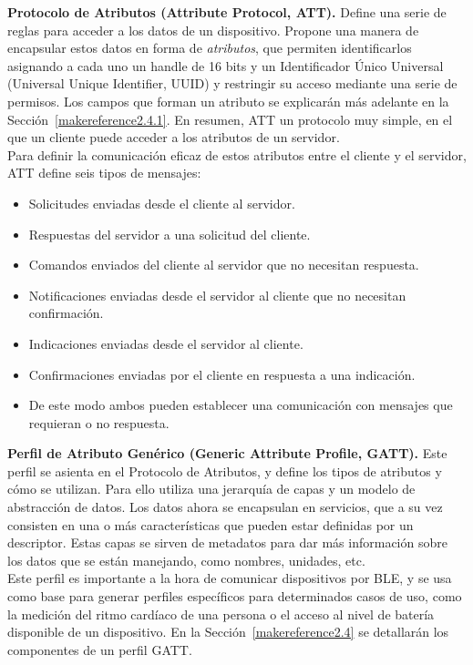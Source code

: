 \textbf{Protocolo de Atributos (Attribute Protocol, ATT).} Define una serie de reglas para acceder a los datos de un dispositivo. Propone una manera de encapsular estos datos en forma de \textit{atributos}, que permiten identificarlos asignando a cada uno un handle de 16 bits y un Identificador Único Universal (Universal Unique Identifier, UUID) y restringir su acceso mediante una serie de permisos. Los campos que forman un atributo se explicarán más adelante en la Sección~\ref{makereference2.4.1}. En resumen, ATT un protocolo muy simple, en el que un cliente puede acceder a los atributos de un servidor.\\
Para definir la comunicación eficaz de estos atributos entre el cliente y el servidor, ATT define seis tipos de mensajes:
\begin{itemize} %
	\item Solicitudes enviadas desde el cliente al servidor.
	\item Respuestas del servidor a una solicitud del cliente.
	\item Comandos enviados del cliente al servidor que no necesitan respuesta. 
	\item Notificaciones enviadas desde el servidor al cliente que no necesitan confirmación.
	\item Indicaciones enviadas desde el servidor al cliente.
	\item Confirmaciones enviadas por el cliente en respuesta a una indicación.
	\item De este modo ambos pueden establecer una comunicación con mensajes que requieran o no respuesta.
\end{itemize}


\textbf{Perfil de Atributo Genérico (Generic Attribute Profile, GATT).} Este perfil se asienta en el Protocolo de Atributos, y define los tipos de atributos y cómo se utilizan. 
Para ello utiliza una jerarquía de capas y un modelo de abstracción de datos. Los datos ahora se encapsulan en servicios, que a su vez consisten en una o más características que pueden estar definidas por un descriptor. Estas capas se sirven de metadatos para dar más información sobre los datos que se están manejando, como nombres, unidades, etc.\\
Este perfil es importante a la hora de comunicar dispositivos por BLE, y se usa como base para generar perfiles específicos para determinados casos de uso, como la medición del ritmo cardíaco de una persona o el acceso al nivel de batería disponible de un dispositivo. En la Sección~\ref{makereference2.4} se detallarán los componentes de un perfil GATT.


